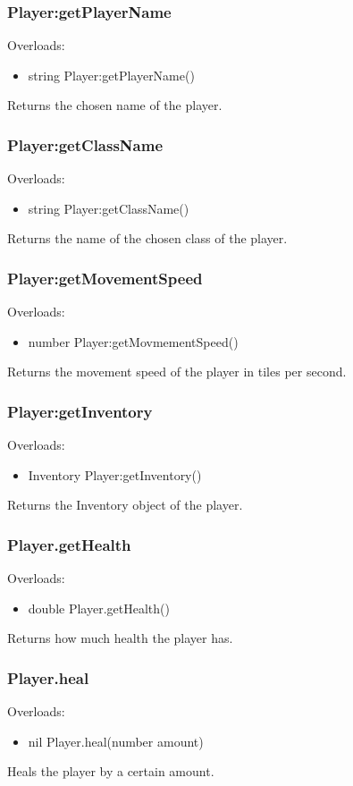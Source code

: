 \documentclass{book}
\newenvironment{ulist}
	{\begin{itemize}
			\itemsep0em}
	{\end{itemize}}
\begin{document}
\subsubsection{Player:getPlayerName}
Overloads:
\begin{ulist}
	\item string Player:getPlayerName()
\end{ulist}
Returns the chosen name of the player.

\subsubsection{Player:getClassName}
Overloads:
\begin{ulist}
	\item string Player:getClassName()
\end{ulist}
Returns the name of the chosen class of the player.

\subsubsection{Player:getMovementSpeed}
Overloads:
\begin{ulist}
	\item number Player:getMovmementSpeed()
\end{ulist}
Returns the movement speed of the player in tiles per second.

\subsubsection{Player:getInventory}
Overloads:
\begin{ulist}
	\item Inventory Player:getInventory()
\end{ulist}
Returns the Inventory object of the player.

\subsubsection{Player.getHealth}
Overloads:
\begin{ulist}
	\item double Player.getHealth()
\end{ulist}
Returns how much health the player has.

\subsubsection{Player.heal}
Overloads:
\begin{ulist}
	\item nil Player.heal(number amount)
\end{ulist}
Heals the player by a certain amount.
\end{document}
